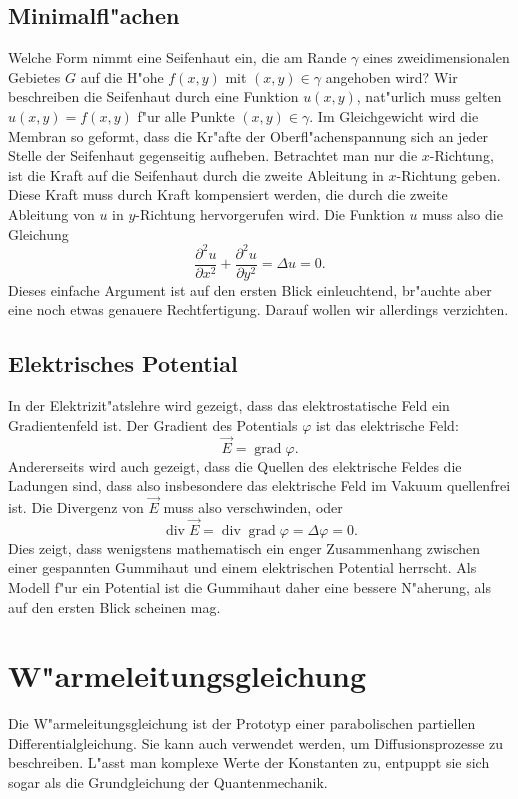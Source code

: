 \subsection{Minimalfl"achen\label{beispiele:minimalflaechen}}
Welche Form nimmt eine Seifenhaut ein, die am Rande $\gamma$ eines
zweidimensionalen Gebietes $G$ auf die H"ohe $f(x,y)$ mit $(x,y)\in \gamma$
angehoben wird? Wir beschreiben die Seifenhaut durch eine Funktion
$ u (x,y)$, nat"urlich muss gelten $ u (x,y)=f(x,y)$ f"ur alle
Punkte $(x,y)\in\gamma$.
Im Gleichgewicht wird die Membran so geformt, dass die Kr"afte
der Oberfl"achenspannung sich an jeder Stelle der Seifenhaut gegenseitig
aufheben. Betrachtet man nur die $x$-Richtung, ist die Kraft auf die
Seifenhaut durch die zweite Ableitung in $x$-Richtung geben.
Diese Kraft muss durch Kraft kompensiert werden, die durch die
zweite Ableitung von $ u $ in $y$-Richtung hervorgerufen wird.
Die Funktion $ u $ muss also die Gleichung
\[
\frac{\partial^2 u }{\partial x^2}+\frac{\partial^2 u }{\partial y^2}
=\Delta u =0.
\]
Dieses einfache Argument ist auf den ersten Blick einleuchtend, br"auchte
aber eine noch etwas genauere Rechtfertigung. Darauf wollen wir allerdings
verzichten.

\subsection{Elektrisches Potential\label{beispiele:elektrischespotential}}
In der Elektrizit"atslehre wird gezeigt, dass das elektrostatische Feld 
ein Gradientenfeld ist. Der Gradient des Potentials $\varphi$  ist das
elektrische Feld:
\[
\vec E=\operatorname{grad}\varphi.
\]
Andererseits wird auch gezeigt, dass die Quellen des elektrische Feldes die
Ladungen sind, dass also insbesondere das elektrische Feld im Vakuum quellenfrei ist.
Die Divergenz von $\vec E$ muss also verschwinden, oder
\[
\operatorname{div}\vec E=\operatorname{div}\operatorname{grad}\varphi
=\Delta \varphi=0.
\]
Dies zeigt, dass wenigstens mathematisch ein enger Zusammenhang zwischen
einer gespannten Gummihaut und einem elektrischen Potential herrscht.
Als Modell f"ur ein Potential ist die Gummihaut daher eine bessere
N"aherung, als auf den ersten Blick scheinen mag.

\section{W"armeleitungsgleichung\label{beispiele:waermeleitung}}
Die W"armeleitungsgleichung ist der Prototyp einer parabolischen partiellen
Differentialgleichung. Sie kann auch verwendet werden, um Diffusionsprozesse
zu beschreiben. L"asst man komplexe Werte der Konstanten zu, entpuppt
sie sich sogar als die Grundgleichung der Quantenmechanik.

